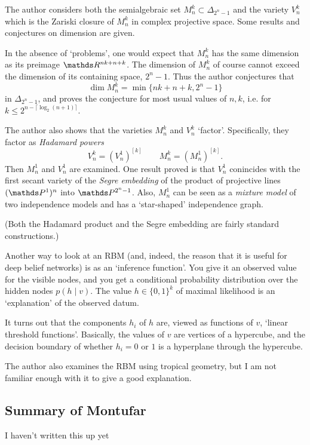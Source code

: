 \documentclass[11pt]{article}
\begin{document}
The author considers both the semialgebraic set $M_n^k \subset \Delta_{2^n - 1}$
and the variety $V_n^k$ which is the Zariski closure of $M_n^k$ in complex
projective space.  Some results and conjectures on dimension are given.

In the absence of `problems', one would expect that $M_n^k$ has the same
dimension as its preimage $\R^{nk + n + k}$.  The dimension of $M_n^k$ of course
cannot exceed the dimension of its containing space, $2^n - 1$.  Thus the author
conjectures that
\[
    \dim M_n^k = \min\{nk+n+k, 2^n -1\}
\]
in $\Delta_{2^n-1}$, and proves the conjecture for most usual values of $n,k$,
i.e. for $k \le 2^{n - \lceil \log_2(n+1) \rceil}$.

The author also shows that the varieties $M_n^k$ and $V_n^k$ `factor'.
Specifically, they factor as \emph{Hadamard powers}
\[
    V_n^k = (V_n^1)^{[k]}
    \qquad
    M_n^k = (M_n^1)^{[k]}.
\]
Then $M_n^1$ and $V_n^1$ are examined.  One result proved is that $V_n^1$
conincides with the first secant variety of the \emph{Segre embedding} of the
product of projective lines $(\Proj^1)^n$ into $\Proj^{2^n-1}$.  Also, $M_n^1$
can be seen as a \emph{mixture model} of two independence models and has a
`star-shaped' independence graph.

(Both the Hadamard product and the Segre embedding are fairly standard
constructions.)

Another way to look at an RBM (and, indeed, the reason that it is useful for
deep belief networks) is as an `inference function'.  You give it an observed
value for the visible nodes, and you get a conditional probability distribution
over the hidden nodes $p(h \mid v)$.  The value $h \in \{0,1\}^k$ of maximal
likelihood is an `explanation' of the observed datum.

It turns out that the components $h_i$ of $h$ are, viewed as functions of $v$,
`linear threshold functions'.  Basically, the values of $v$ are vertices of a
hypercube, and the decision boundary of whether $h_i = 0$ or $1$ is a hyperplane
through the hypercube.

The author also examines the RBM using tropical geometry, but I am not familiar
enough with it to give a good explanation.

\subsection{Summary of Montufar}

I haven't written this up yet
\end{document}

